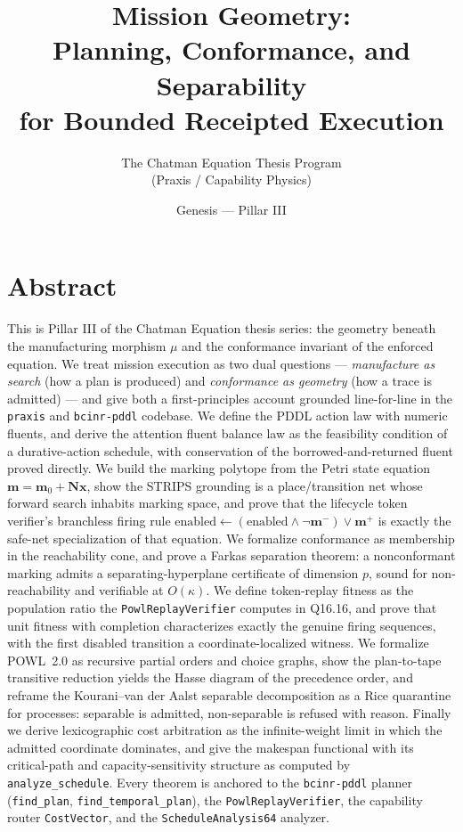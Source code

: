 \documentclass[11pt,oneside]{book}
\title{\bfseries Mission Geometry:\\[0.4em]
\large Planning, Conformance, and Separability\\
for Bounded Receipted Execution}
\author{The Chatman Equation Thesis Program \\ (Praxis / Capability Physics)}
\date{Genesis --- Pillar III}
\theoremstyle{definition}
\theoremstyle{plain}
\theoremstyle{remark}
\newcommand{\muop}{\mu}                        %
\newcommand{\CL}{\kappa}                       %
\newcommand{\Nmat}{\mathbf{N}}                 %
\newcommand{\code}[1]{\texttt{#1}}
\begin{document}
\frontmatter
\maketitle

\chapter*{Abstract}
This is Pillar III of the Chatman Equation thesis series: the geometry beneath the
manufacturing morphism $\muop$ and the conformance invariant of the enforced equation. We
treat mission execution as two dual questions --- \emph{manufacture as search} (how a plan
is produced) and \emph{conformance as geometry} (how a trace is admitted) --- and give both
a first-principles account grounded line-for-line in the \code{praxis} and \code{bcinr-pddl}
codebase. We define the PDDL action law with numeric fluents, and derive the attention
fluent balance law as the feasibility condition of a durative-action schedule, with
conservation of the borrowed-and-returned fluent proved directly. We build the marking
polytope from the Petri state equation $\bm m=\bm m_{0}+\Nmat\bm x$, show the STRIPS
grounding is a place/transition net whose forward search inhabits marking space, and prove
that the lifecycle token verifier's branchless firing rule
$\text{enabled}\gets(\text{enabled}\wedge\lnot\bm m^{-})\vee\bm m^{+}$ is exactly the
safe-net specialization of that equation. We formalize conformance as membership in the
reachability cone, and prove a Farkas separation theorem: a nonconformant marking admits a
separating-hyperplane certificate of dimension $p$, sound for non-reachability and verifiable
at $O(\CL)$. We define token-replay fitness as the population ratio the
\code{PowlReplayVerifier} computes in Q16.16, and prove that unit fitness with completion
characterizes exactly the genuine firing sequences, with the first disabled transition a
coordinate-localized witness. We formalize POWL~2.0 as recursive partial orders and choice
graphs, show the plan-to-tape transitive reduction yields the Hasse diagram of the precedence
order, and reframe the Kourani--van der Aalst separable decomposition
\cite{powl2023} as a Rice quarantine for processes: separable is admitted, non-separable is
refused with reason. Finally we derive lexicographic cost arbitration as the infinite-weight
limit in which the admitted coordinate dominates, and give the makespan functional with its
critical-path and capacity-sensitivity structure as computed by \code{analyze\_schedule}.
Every theorem is anchored to the \code{bcinr-pddl} planner (\code{find\_plan},
\code{find\_temporal\_plan}), the \code{PowlReplayVerifier}, the capability router
\code{CostVector}, and the \code{ScheduleAnalysis64} analyzer.
\end{document}
